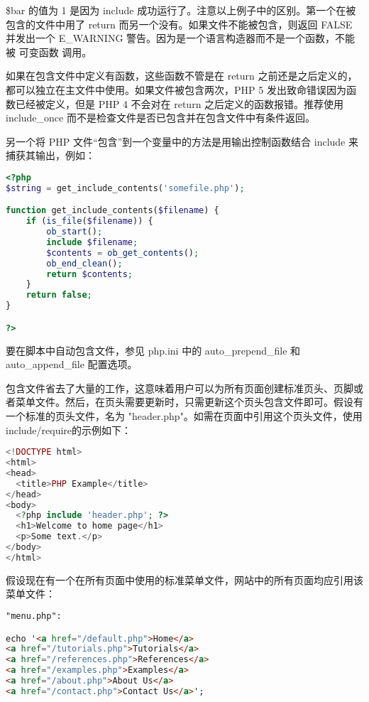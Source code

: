 \$bar 的值为 1 是因为 include 成功运行了。注意以上例子中的区别。第一个在被包含的文件中用了 return 而另一个没有。如果文件不能被包含，则返回 FALSE 并发出一个 E\_WARNING 警告。因为是一个语言构造器而不是一个函数，不能被 可变函数 调用。

如果在包含文件中定义有函数，这些函数不管是在 return 之前还是之后定义的，都可以独立在主文件中使用。如果文件被包含两次，PHP 5 发出致命错误因为函数已经被定义，但是 PHP 4 不会对在 return 之后定义的函数报错。推荐使用 include\_once 而不是检查文件是否已包含并在包含文件中有条件返回。

另一个将 PHP 文件“包含”到一个变量中的方法是用输出控制函数结合 include 来捕获其输出，例如：


\begin{lstlisting}[language=PHP]
<?php
$string = get_include_contents('somefile.php');

function get_include_contents($filename) {
    if (is_file($filename)) {
        ob_start();
        include $filename;
        $contents = ob_get_contents();
        ob_end_clean();
        return $contents;
    }
    return false;
}

?>
\end{lstlisting}

要在脚本中自动包含文件，参见 php.ini 中的 auto\_prepend\_file 和 auto\_append\_file 配置选项。

包含文件省去了大量的工作，这意味着用户可以为所有页面创建标准页头、页脚或者菜单文件。然后，在页头需要更新时，只需更新这个页头包含文件即可。假设有一个标准的页头文件，名为 "header.php"。如需在页面中引用这个页头文件，使用 include/require的示例如下：


\begin{lstlisting}[language=PHP]
<!DOCTYPE html>
<html>
<head>
  <title>PHP Example</title>
</head>
<body>
  <?php include 'header.php'; ?>
  <h1>Welcome to home page</h1>
  <p>Some text.</p>
</body>
</html>
\end{lstlisting}

假设现在有一个在所有页面中使用的标准菜单文件，网站中的所有页面均应引用该菜单文件：

\begin{lstlisting}[language=HTML]
"menu.php":

echo '<a href="/default.php">Home</a>
<a href="/tutorials.php">Tutorials</a>
<a href="/references.php">References</a>
<a href="/examples.php">Examples</a>
<a href="/about.php">About Us</a>
<a href="/contact.php">Contact Us</a>';
\end{lstlisting}

